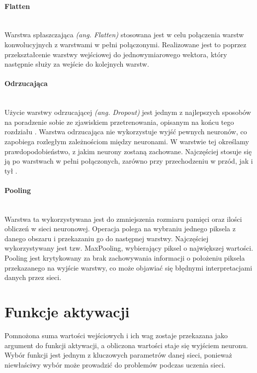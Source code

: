 \paragraph{Flatten} \mbox{}\\
Warstwa spłaszczająca \textit{(ang. Flatten)} stosowana jest w celu połączenia warstw
konwolucyjnych z warstwami w pełni połączonymi. Realizowane jest to poprzez przekształcenie
warstwy wejściowej do jednowymiarowego wektora, który następnie służy za wejście
do kolejnych warstw.

\paragraph{Odrzucająca} \mbox{}\\
Użycie warstwy odrzucającej \textit{(ang. Dropout)} jest jednym z najlepszych sposobów
na poradzenie sobie ze zjawiskiem przetrenowania, opisanym na końcu tego rozdziału
\cite{DropoutPreventOverfit}. Warstwa odrzucająca nie wykorzystuje wyjść pewnych neuronów,
co zapobiega rozległym zależnościom między neuronami. W warstwie tej określamy prawdopodobieństwo,
z jakim neurony zostaną zachowane. Najczęściej stosuje się ją po warstwach w pełni
połączonych, zarówno przy przechodzeniu w przód, jak i tył \cite{DropConnect}.

\paragraph{Pooling} \mbox{}\\
Warstwa ta wykorzystywana jest do zmniejszenia rozmiaru pamięci oraz ilości obliczeń
w sieci neuronowej. Operacja polega na wybraniu jednego piksela z danego obszaru i przekazaniu
go do następnej warstwy. Najczęściej wykorzystywany jest tzw. MaxPooling, wybierający
piksel o największej wartości. Pooling jest krytykowany za brak zachowywania informacji
o położeniu piksela przekazanego na wyjście warstwy, co może objawiać się błędnymi
interpretacjami danych przez sieci.

\section{Funkcje aktywacji}

Pomnożona suma wartości wejściowych i ich wag zostaje przekazana
jako argument do funkcji aktywacji, a obliczona wartości staje się wyjściem neuronu.
Wybór funkcji jest jednym z kluczowych parametrów danej sieci, ponieważ niewłaściwy wybór
może prowadzić do problemów podczas uczenia sieci.


